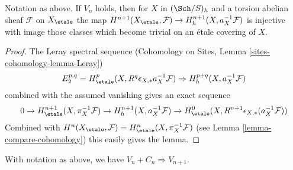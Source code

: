 \begin{lemma}
\label{lemma-V-implies-cohomology-etale-h-extra}
Notation as above. If $V_n$ holds, then for
$X$ in $(\Sch/S)_h$ and a torsion abelian sheaf $\mathcal{F}$ on $X_\etale$
the map
$H^{n + 1}(X_\etale, \mathcal{F}) \to H^{n + 1}_h(X, a_X^{-1}\mathcal{F})$
is injective with image those classes which become trivial on
an \'etale covering of $X$.
\end{lemma}

\begin{proof}
The Leray spectral sequence (Cohomology on Sites, Lemma
\ref{sites-cohomology-lemma-Leray})
$$
E_2^{p, q} = H^p_\etale(X, R^q\epsilon_{X, *}a_X^{-1}\mathcal{F})
\Rightarrow
H^{p + q}_h(X, a_X^{-1}\mathcal{F})
$$
combined with the assumed vanishing gives an exact sequence
$$
0 \to
H^{n + 1}_\etale(X, \pi_X^{-1}\mathcal{F}) \to
H^{n + 1}_h(X, a_X^{-1}\mathcal{F}) \to
H^0_\etale(X, R^{n + 1}\epsilon_{X, *}(a_X^{-1}\mathcal{F}))
$$
Combined with
$H^n(X_\etale, \mathcal{F}) = H^n_\etale(X, \pi_X^{-1}\mathcal{F})$
(see Lemma \ref{lemma-compare-cohomology}) this easily gives the lemma.
\end{proof}

\begin{lemma}
\label{lemma-induction-step-V-C-etale-h}
With notation as above, we have $V_n + C_n \Rightarrow V_{n + 1}$.
\end{lemma}

